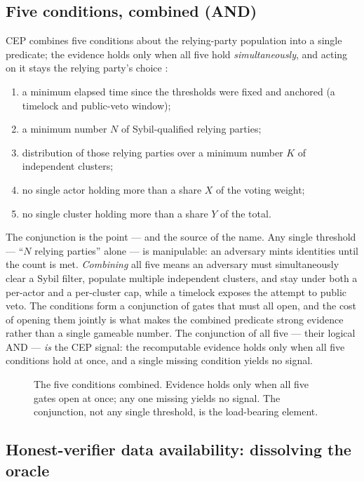 \subsection{Five conditions, combined (AND)}
\label{subsec:ramp}

CEP combines five conditions about the relying-party population into a single predicate; the evidence holds only when all five hold \emph{simultaneously}, and acting on it stays the relying party's choice \cite{ref28_techspec}:

\begin{enumerate}
  \item a minimum elapsed time since the thresholds were fixed and anchored (a timelock and public-veto window);
  \item a minimum number $N$ of Sybil-qualified relying parties;
  \item distribution of those relying parties over a minimum number $K$ of independent clusters;
  \item no single actor holding more than a share $X$ of the voting weight;
  \item no single cluster holding more than a share $Y$ of the total.
\end{enumerate}

The conjunction is the point — and the source of the name. Any single threshold — ``$N$ relying parties'' alone — is manipulable: an adversary mints identities until the count is met. \emph{Combining} all five means an adversary must simultaneously clear a Sybil filter, populate multiple independent clusters, and stay under both a per-actor and a per-cluster cap, while a timelock exposes the attempt to public veto. The conditions form a conjunction of gates that must all open, and the cost of opening them jointly is what makes the combined predicate strong evidence rather than a single gameable number. The conjunction of all five — their logical AND — \emph{is} the CEP signal: the recomputable evidence holds only when all five conditions hold at once, and a single missing condition yields no signal.

\begin{figure}[tb]
\centering

\caption{The five conditions combined. Evidence holds only when all five gates open at once; any one missing yields no signal. The conjunction, not any single threshold, is the load-bearing element.}
\label{fig:cep-conditions}
\end{figure}

\subsection{Honest-verifier data availability: dissolving the oracle}
\label{subsec:hvda}

